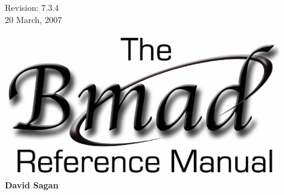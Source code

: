 \thispagestyle{empty}

\begin{flushright}
\large
  Revision: 7.3.4 \\
  20 March, 2007 \\
\end{flushright}

\vfill

{
\begin{center}
\includegraphics[width=12cm]{bmad-ref-manual.eps} \\
\vskip 0.3in
\huge\bf David Sagan
\end{center}
}

\vfill
\break
